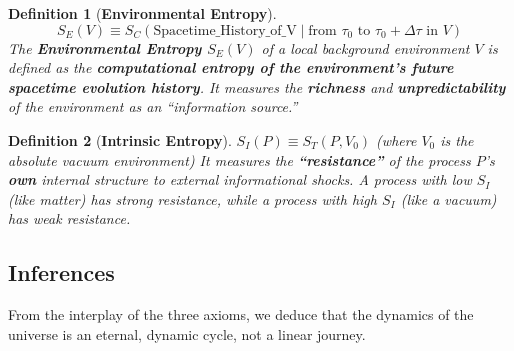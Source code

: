 \documentclass[11pt, a4paper]{article}
\newtheorem{definition}{Definition}[section]
\begin{document}
\begin{definition}[\textbf{Environmental Entropy}]
\[
S_E(V) \equiv S_C( \text{Spacetime\_History\_of\_V} \mid \text{from } \tau_0 \text{ to } \tau_0+\Delta\tau \text{ in } V )
\]
The \textbf{Environmental Entropy $S_E(V)$} of a local background environment $V$ is defined as the \textbf{computational entropy of the environment's future spacetime evolution history}. It measures the \textbf{richness} and \textbf{unpredictability} of the environment as an ``information source.''
\end{definition}

\begin{definition}[\textbf{Intrinsic Entropy}]
$S_I(P) \equiv S_T(P, V_0)$ (where $V_0$ is the absolute vacuum environment)
It measures the \textbf{``resistance''} of the process $P$'s \textbf{own} internal structure to external informational shocks. A process with low $S_I$ (like matter) has strong resistance, while a process with high $S_I$ (like a vacuum) has weak resistance.
\end{definition}

\subsection*{Inferences}
From the interplay of the three axioms, we deduce that the dynamics of the universe is an eternal, dynamic cycle, not a linear journey.
\end{document}
